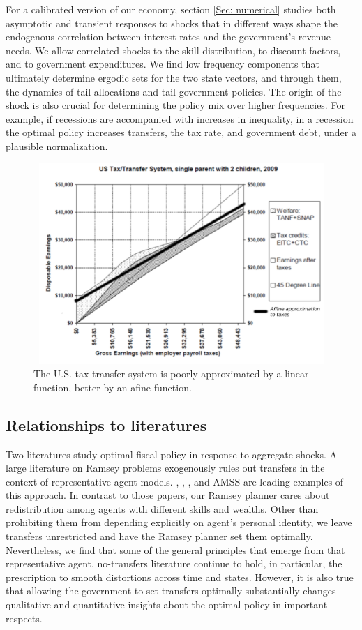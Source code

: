\documentclass[thmsb,11pt]{article}
\begin{document}
 For a calibrated version of our economy, section \ref{Sec: numerical} studies both asymptotic and transient responses to shocks
 that    in different ways shape the endogenous correlation between interest rates and the government's revenue needs.  We allow correlated shocks
 to the skill distribution, to discount factors, and to government expenditures.
We find  low frequency components that ultimately determine  ergodic sets for the two state vectors, and through them, the dynamics of tail allocations and tail government policies.  The origin of the shock is also crucial for determining the policy mix over higher frequencies. For example, if recessions are accompanied with increases in inequality, in a recession the optimal policy increases  transfers, the tax rate, and   government debt, under a plausible
normalization.




  \begin{figure}[htp]
 \centering
 \includegraphics[width=5in,height=3in]{Draft25Graphs/affine_taxes.pdf}
 \caption{ The U.S. tax-transfer system is poorly approximated by a linear function, better by an afine
function.}
 \label{fig:affine_taxes}
 \end{figure}


\subsection{Relationships to literatures}

Two literatures study optimal fiscal policy in
response to  aggregate shocks. A large  literature on Ramsey problems  exogenously rules out transfers in
the context of
representative agent models.
 \citet{Barro1979}, \citet{LucasJr.1983}, \citet{Chari1994},  and AMSS are leading  examples of this approach.
In contrast to those papers, our Ramsey planner cares about redistribution among
agents with different skills and wealths. Other than prohibiting them from depending explicitly
on agent's personal identity, we leave   transfers unrestricted and have the Ramsey planner set
them optimally. Nevertheless, we find that  some of the general principles that emerge from that
representative agent, no-transfers literature continue to hold, in particular, the prescription to
smooth distortions across time and states.  However, it is also true that
allowing the government to set transfers optimally substantially changes
qualitative and quantitative insights about the optimal policy in important respects.
\end{document}

